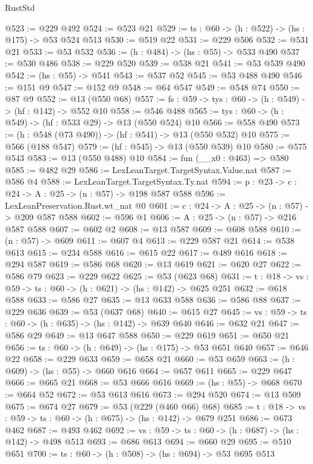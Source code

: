 \begin{lexlean}{RustStd}
\begin{coremodule}
@523 := @229 @492
@524 := @523 @21
@529 := {ts : @60} -> (h : @522) -> (hs : @175) -> @53 @524 @513
@530 := @519 @22
@531 := @229 @506
@532 := @531 @21
@533 := @53 @532
@536 := (h : @484) -> (hs : @55) -> @533 @490
@537 := @530 @486
@538 := @229 @520
@539 := @538 @21
@541 := @53 @539 @490
@542 := (hs : @55) -> @541
@543 := @537 @52
@545 := @53 @488 @490
@546 := @151 @9
@547 := @152 @9
@548 := @64 @547
@549 := @548 @74
@550 := @87 @9
@552 := @13 (@550 @68)
@557 := {fs : @59} -> {tys : @60} -> (h : @549) -> (hf : @142) -> @552 @10
@558 := @546 @488
@565 := {tys : @60} -> (h : @549) -> (hf : @533 @29) -> @13 (@550 @524) @10
@566 := @558 @490
@573 := (h : @548 (@73 @490)) -> (hf : @541) -> @13 (@550 @532) @10
@575 := @566 (@188 @547)
@579 := (hf : @545) -> @13 (@550 @539) @10
@580 := @575 @543
@583 := @13 (@550 @488) @10
@584 := fun (__x0 : @463) => @580
@585 := @482 @29
@586 := LexLeanTarget.TargetSyntax.Value.nat
@587 := @586 @4
@588 := LexLeanTarget.TargetSyntax.Ty.nat
@594 := {p : @23} -> {c : @24} -> {A : @25} -> (n : @57) -> @198 @587 @588
@596 := LexLeanPreservation.Rust.wt_nat @0
@601 := {c : @24} -> {A : @25} -> (n : @57) -> @209 @587 @588
@602 := @596 @1
@606 := {A : @25} -> (n : @57) -> @216 @587 @588
@607 := @602 @2
@608 := @13 @587
@609 := @608 @588
@610 := (n : @57) -> @609
@611 := @607 @4
@613 := @229 @587 @21
@614 := @538 @613
@615 := @234 @588
@616 := @615 @22
@617 := @489 @616
@618 := @294 @587
@619 := @586 @68
@620 := @13 @619
@621 := @620 @27
@622 := @586 @79
@623 := @229 @622
@625 := @53 (@623 @68)
@631 := {t : @18} -> {vs : @59} -> {ts : @60} -> (h : @621) -> (hs : @142) -> @625 @251
@632 := @618 @588
@633 := @586 @27
@635 := @13 @633 @588
@636 := @586 @88
@637 := @229 @636
@639 := @53 (@637 @68)
@640 := @615 @27
@645 := {vs : @59} -> {ts : @60} -> (h : @635) -> (hs : @142) -> @639 @640
@646 := @632 @21
@647 := @586 @29
@649 := @13 @647 @588
@650 := @229 @619
@651 := @650 @21
@656 := {ts : @60} -> (h : @649) -> (hs : @175) -> @53 @651 @640
@657 := @646 @22
@658 := @229 @633
@659 := @658 @21
@660 := @53 @659
@663 := (h : @609) -> (hs : @55) -> @660 @616
@664 := @657 @611
@665 := @229 @647
@666 := @665 @21
@668 := @53 @666 @616
@669 := (hs : @55) -> @668
@670 := @664 @52
@672 := @53 @613 @616
@673 := @294 @520
@674 := @13 @509
@675 := @674 @27
@679 := @53 (@229 (@460 @66) @68)
@685 := {t : @18} -> {vs : @59} -> {ts : @60} -> (h : @675) -> (hs : @142) -> @679 @251
@686 := @673 @462
@687 := @493 @462
@692 := {vs : @59} -> {ts : @60} -> (h : @687) -> (hs : @142) -> @498 @513
@693 := @686 @613
@694 := @660 @29
@695 := @510 @651
@700 := {ts : @60} -> (h : @508) -> (hs : @694) -> @53 @695 @513

\end{coremodule}
\end{lexlean}
